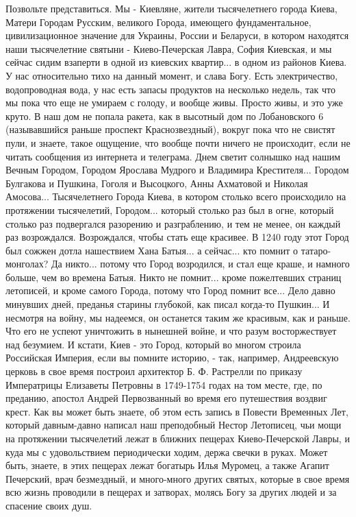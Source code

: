 Позвольте представиться. Мы - Киевляне, жители тысячелетнего города Киева,
Матери Городам Русским, великого Города, имеющего фундаментальное,
цивилизационное значение для Украины, России и Беларуси, в котором находятся
наши тысячелетние святыни - Киево-Печерская Лавра, София Киевская, и мы сейчас
сидим взаперти в одной из киевских квартир... в одном из районов Киева. У нас
относительно тихо на данный момент, и слава Богу. Есть электричество,
водопроводная вода, у нас есть запасы продуктов на несколько недель, так что мы
пока что еще не умираем с голоду, и вообще живы. Просто живы, и это уже круто.
В наш дом не попала ракета, как в высотный дом по Лобановского 6 (называвшийся
раньше проспект Краснозвездный), вокруг пока что не свистят пули, и знаете,
такое ощущение, что вообще почти ничего не происходит, если не читать сообщения
из интернета и телеграма.  Днем светит солнышко над нашим Вечным Городом,
Городом Ярослава Мудрого и Владимира Крестителя... Городом Булгакова и Пушкина,
Гоголя и Высоцкого, Анны Ахматовой и Николая Амосова...  Тысячелетнего Города
Киева, в котором столько всего происходило на протяжении тысячелетий,
Городом... который столько раз был в огне, который столько раз подвергался
разорению и разграблению, и тем не менее, он каждый раз возрождался.
Возрождался, чтобы стать еще красивее. В 1240 году этот Город был сожжен дотла
нашествием Хана Батыя... а сейчас... кто помнит о татаро-монголах?  Да никто...
потому что Город возродился, и стал еще краше, и намного больше, чем во времена
Батыя.  Никто не помнит... кроме пожелтевших страниц летописей, и кроме самого
Города, потому что Город помнит все... Дело давно минувших дней, преданья
старины глубокой, как писал когда-то Пушкин... И несмотря на войну, мы
надеемся, он останется таким же красивым, как и раньше.  Что его не успеют
уничтожить в нынешней войне, и что разум восторжествует над безумием.  И
кстати, Киев - это Город, который во многом строила Российская Империя, если вы
помните историю, - так, например, Андреевскую церковь в свое время построил
архитектор Б. Ф.  Растрелли по приказу Императрицы Елизаветы Петровны в
1749-1754 годах на том месте, где, по преданию, апостол Андрей Первозванный во
время его путешествия воздвиг крест. Как вы может быть знаете, об этом есть
запись в Повести Временных Лет, который давным-давно написал наш преподобный
Нестор Летописец, чьи мощи на протяжении тысячелетий лежат в ближних пещерах
Киево-Печерской Лавры, и куда мы с удовольствием периодически ходим, держа
свечки в руках.  Может быть, знаете, в этих пещерах лежат богатырь Илья
Муромец, а также Агапит Печерский, врач безмездный, и много-много других
святых, которые в свое время всю жизнь проводили в пещерах и затворах, молясь
Богу за других людей и за спасение своих душ.

